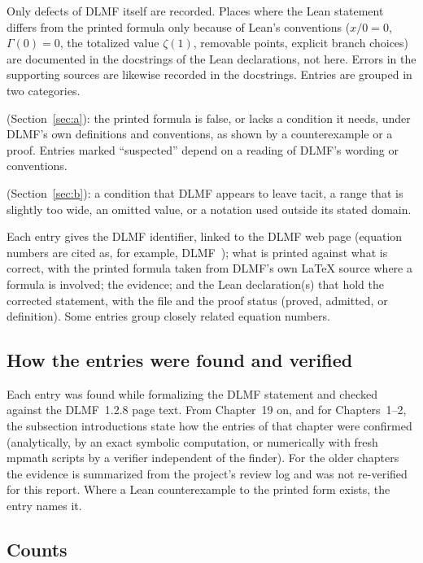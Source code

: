 \documentclass[11pt,a4paper]{article}
\newcounter{entry}
\begin{document}
Only defects of DLMF itself are recorded. Places where the Lean statement differs from the
printed formula only because of Lean's conventions ($x/0=0$, $\Gamma(0)=0$, the totalized value
$\zeta(1)$, removable points, explicit branch choices) are documented in the docstrings of the
Lean declarations, not here. Errors in the supporting sources are likewise recorded in the
docstrings. Entries are grouped in two categories.
\begin{description}[font=\normalfont\bfseries, leftmargin=1.5em, labelindent=0pt]
\item[(a) Confirmed errata] (Section~\ref{sec:a}): the printed formula is false, or lacks a
  condition it needs, under DLMF's own definitions and conventions, as shown by a
  counterexample or a proof. Entries marked ``suspected'' depend on a reading of DLMF's wording
  or conventions.
\item[(b) Suspected errata and unstated conditions] (Section~\ref{sec:b}): a condition that
  DLMF appears to leave tacit, a range that is slightly too wide, an omitted value, or a
  notation used outside its stated domain.
\end{description}

Each entry gives the DLMF identifier, linked to the DLMF web page (equation numbers are cited
as, for example, DLMF~); what is printed against what is correct, with the printed
formula taken from DLMF's own \LaTeX{} source where a formula is involved; the evidence; and the
Lean declaration(s) that hold the corrected statement, with the file and the proof status
(proved, admitted, or definition). Some entries group closely related equation numbers.

\subsection{How the entries were found and verified}

Each entry was found while formalizing the DLMF statement and checked against the DLMF~1.2.8
page text. From Chapter~19 on, and for Chapters~1--2, the subsection introductions state how
the entries of that chapter were confirmed (analytically, by an exact symbolic computation, or
numerically with fresh mpmath scripts by a verifier independent of the finder). For the older
chapters the evidence is summarized from the project's review log and was not re-verified for
this report. Where a Lean counterexample to the printed form exists, the entry names it.

\subsection{Counts}
\end{document}
